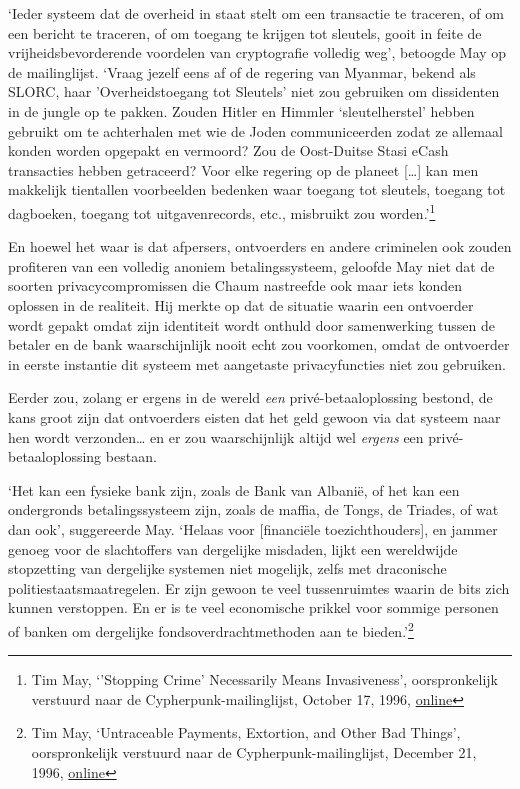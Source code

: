 \documentclass[
  a5paper,
  smalldemyvopaper,11pt,twoside,onecolumn,openright,extrafontsizes]{memoir}
\begin{document}
`Ieder systeem dat de overheid in staat stelt om een transactie te
traceren, of om een bericht te traceren, of om toegang te krijgen tot
sleutels, gooit in feite de vrijheidsbevorderende voordelen van
cryptografie volledig weg', betoogde May op de mailinglijst. `Vraag
jezelf eens af of de regering van Myanmar, bekend als SLORC, haar
'Overheidstoegang tot Sleutels' niet zou gebruiken om dissidenten in de
jungle op te pakken. Zouden Hitler en Himmler `sleutelherstel' hebben
gebruikt om te achterhalen met wie de Joden communiceerden zodat ze
allemaal konden worden opgepakt en vermoord? Zou de Oost-Duitse Stasi
eCash transacties hebben getraceerd? Voor elke regering op de planeet
{[}\ldots{]} kan men makkelijk tientallen voorbeelden bedenken waar
toegang tot sleutels, toegang tot dagboeken, toegang tot
uitgavenrecords, etc., misbruikt zou worden.'\footnote{Tim May,
  `'Stopping Crime' Necessarily Means Invasiveness', oorspronkelijk
  verstuurd naar de Cypherpunk-mailinglijst, October 17, 1996,
  \href{https://cypherpunks.venona.com/date/1996/10/msg01269.html}{online}}

En hoewel het waar is dat afpersers, ontvoerders en andere criminelen
ook zouden profiteren van een volledig anoniem betalingssysteem,
geloofde May niet dat de soorten privacycompromissen die Chaum
nastreefde ook maar iets konden oplossen in de realiteit. Hij merkte op
dat de situatie waarin een ontvoerder wordt gepakt omdat zijn identiteit
wordt onthuld door samenwerking tussen de betaler en de bank
waarschijnlijk nooit echt zou voorkomen, omdat de ontvoerder in eerste
instantie dit systeem met aangetaste privacyfuncties niet zou gebruiken.

Eerder zou, zolang er ergens in de wereld \emph{een}
privé-betaaloplossing bestond, de kans groot zijn dat ontvoerders eisten
dat het geld gewoon via dat systeem naar hen wordt verzonden\ldots{} en
er zou waarschijnlijk altijd wel \emph{ergens} een privé-betaaloplossing
bestaan.

`Het kan een fysieke bank zijn, zoals de Bank van Albanië, of het kan
een ondergronds betalingssysteem zijn, zoals de maffia, de Tongs, de
Triades, of wat dan ook', suggereerde May. `Helaas voor {[}financiële
toezichthouders{]}, en jammer genoeg voor de slachtoffers van dergelijke
misdaden, lijkt een wereldwijde stopzetting van dergelijke systemen niet
mogelijk, zelfs met draconische politiestaatsmaatregelen. Er zijn gewoon
te veel tussenruimtes waarin de bits zich kunnen verstoppen. En er is te
veel economische prikkel voor sommige personen of banken om dergelijke
fondsoverdrachtmethoden aan te bieden.'\footnote{Tim May, `Untraceable
  Payments, Extortion, and Other Bad Things', oorspronkelijk verstuurd
  naar de Cypherpunk-mailinglijst, December 21, 1996,
  \href{https://cypherpunks.venona.com/date/1996/12/msg01468.html}{online}}
\end{document}
